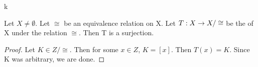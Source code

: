 k\label{prop:QuotientMapSurjective}
\begin{prop}
    Let $X \neq \emptyset$. 
    Let $\cong$ be an equivalence relation on X.
    Let $T : X\to X/\cong$  be the \QuotientMap of X under the relation $\cong$. 
    Then T is a surjection. 
    \begin{proof}
       Let $K \in Z/\cong$. 
       Then for some $x \in Z$, $K=[x]$. 
       Then $T(x) = K$. 
       Since K was arbitrary, we are done. 
    \end{proof}
\end{prop} 
